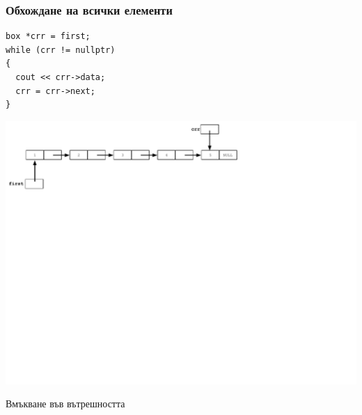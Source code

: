 \documentclass{beamer}
\begin{document}
\begin{frame}[fragile]
\frametitle{Обхождане на всички елементи}

\begin{flushleft}
\begin{lstlisting}
box *crr = first;
while (crr != nullptr)
{
  cout << crr->data;
  crr = crr->next;
}
\end{lstlisting}  
\end{flushleft}


\includegraphics[width=14.0cm]{images/04_ll_trav_eol}

\end{frame}


\begin{frame}
\centerline{Вмъкване във вътрешността}
\end{frame}
\end{document}
